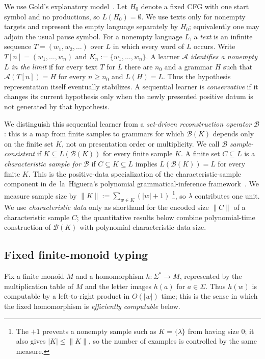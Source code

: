 \documentclass[11pt,a4paper]{article}
\theoremstyle{remark}
\theoremstyle{plain}
\begin{document}
We use Gold's explanatory model~\cite{gold1967}.  Let $H_0$ denote a fixed
CFG with one start symbol and no productions, so $L(H_0)=\emptyset$.  We use
texts only for nonempty targets and represent the empty language separately by
$H_0$; equivalently one may adjoin the usual pause symbol.  For a nonempty language $L$, a \emph{text} is an
infinite sequence $T=(w_1,w_2,\ldots)$ over $L$ in which every word of $L$
occurs.  Write $T[n]=(w_1,\ldots,w_n)$ and
$K_n:=\{w_1,\ldots,w_n\}$.  A learner $\mathcal A$
\emph{identifies a nonempty $L$ in the limit} if for every text $T$ for $L$
there are $n_0$ and a grammar $H$ such that $\mathcal A(T[n])=H$ for every
$n\ge n_0$ and $L(H)=L$.
Thus the hypothesis representation itself eventually stabilizes.  A
sequential learner is \emph{conservative} if it changes its current hypothesis
only when the newly presented positive datum is not generated by that
hypothesis.

We distinguish this sequential learner from a \emph{set-driven reconstruction
operator} $\mathcal B$: this is a map from finite samples to grammars for
which $\mathcal B(K)$ depends only on the finite set $K$, not on presentation
order or multiplicity.  We call $\mathcal B$
\emph{sample-consistent} if $K\subseteq L(\mathcal B(K))$ for every finite
sample $K$.  A finite set $C\subseteq L$ is a \emph{characteristic sample for
$\mathcal B$} if
$C\subseteq K\subseteq L$ implies $L(\mathcal B(K))=L$ for every finite
$K$.  This is the positive-data specialization of the characteristic-sample
component in de~la~Higuera's polynomial grammatical-inference
framework~\cite{higuera1997}.  We measure sample size by
$\|K\|:=\sum_{w\in K}(|w|+1)$%
\footnote{The $+1$ prevents a nonempty sample such as $K=\{\lambda\}$ from having size $0$; it also gives $|K|\le\|K\|$, so the number of examples is controlled by the same measure.},
so $\lambda$ contributes one unit.  We use \emph{characteristic data} only
as shorthand for the encoded size $\|C\|$ of a characteristic sample $C$;
the quantitative results below combine polynomial-time construction of
$\mathcal B(K)$ with polynomial characteristic-data size.

\subsection{Fixed finite-monoid typing}\label{sec:fixed-typing}

Fix a finite monoid $M$ and a homomorphism $h:\Sigma^*\to M$, represented
by the multiplication table of $M$ and the letter images $h(a)$ for
$a\in\Sigma$.  Thus $h(w)$ is computable by a left-to-right product in
$O(|w|)$ time; this is the sense in which the fixed homomorphism is
\emph{efficiently computable} below.
\end{document}
